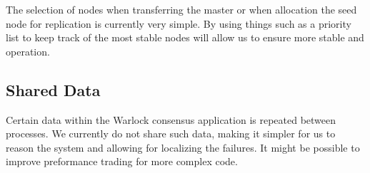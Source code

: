 The selection of nodes when transferring the master or when allocation the
seed node for replication is currently very simple. By using things such
as a priority list to keep track of the most stable nodes will allow us to
ensure more stable and operation.

\subsection{Shared Data}

Certain data within the Warlock consensus application is repeated between
processes. We currently do not share such data, making it simpler for us
to reason the system and allowing for localizing the failures. It might
be possible to improve preformance trading for more complex code.


